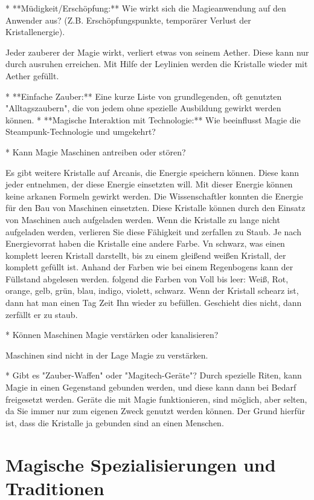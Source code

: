 \documentclass[10pt,a4paper,twocolumn,openany]{book}
\begin{document}
* **Müdigkeit/Erschöpfung:** Wie wirkt sich die Magieanwendung auf den Anwender aus? (Z.B. Erschöpfungspunkte, temporärer Verlust der Kristallenergie).

Jeder zauberer der Magie wirkt, verliert etwas von seinem Aether. Diese kann nur durch ausruhen erreichen. Mit Hilfe der Leylinien werden die Kristalle wieder mit Aether gefüllt.

* **Einfache Zauber:** Eine kurze Liste von grundlegenden, oft genutzten "Alltagszaubern", die von jedem ohne spezielle Ausbildung gewirkt werden können.
* **Magische Interaktion mit Technologie:** Wie beeinflusst Magie die Steampunk-Technologie und umgekehrt?

* Kann Magie Maschinen antreiben oder stören?

Es gibt weitere Kristalle auf Arcanis, die Energie speichern können. Diese kann jeder entnehmen, der diese Energie einsetzten will. Mit dieser Energie können keine arkanen Formeln gewirkt werden.
Die Wissenschaftler konnten die Energie für den Bau von Maschinen einsetzten. Diese Kristalle können durch den Einsatz von Maschinen auch aufgeladen werden. Wenn die Kristalle zu lange nicht aufgeladen werden, verlieren Sie diese Fähigkeit und zerfallen zu Staub. Je nach Energievorrat haben die Kristalle eine andere Farbe. Vn schwarz, was einen komplett leeren Kristall darstellt, bis zu einem gleißend weißen Kristall, der komplett gefüllt ist.
Anhand der Farben wie bei einem Regenbogens kann der Füllstand abgelesen werden. folgend die Farben von Voll bis leer: Weiß, Rot, orange, gelb, grün, blau, indigo, violett, schwarz. Wenn der Kristall schearz ist, dann hat man einen Tag Zeit Ihn wieder zu befüllen. Geschieht dies nicht, dann zerfällt er zu staub.

* Können Maschinen Magie verstärken oder kanalisieren?

Maschinen sind nicht in der Lage Magie zu verstärken.

* Gibt es "Zauber-Waffen" oder "Magitech-Geräte"?
Durch spezielle Riten, kann Magie in einen Gegenstand gebunden werden, und diese kann dann bei Bedarf freigesetzt werden. Geräte die mit Magie funktionieren, sind möglich, aber selten, da Sie immer nur zum eigenen Zweck genutzt werden können. Der Grund hierfür ist, dass die Kristalle ja gebunden sind an einen Menschen.



\chapter{Magische Spezialisierungen und Traditionen}
\end{document}
